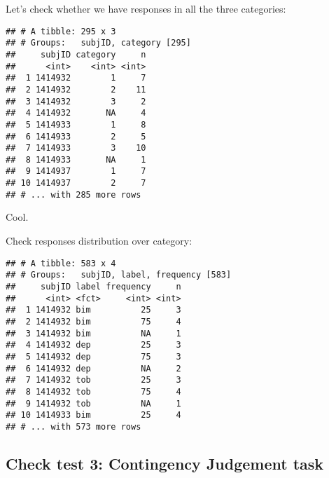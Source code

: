 \documentclass[
]{article}
\newenvironment{Shaded}{\begin{snugshade}}{\end{snugshade}}
\newcommand{\KeywordTok}[1]{\textcolor[rgb]{0.13,0.29,0.53}{\textbf{#1}}}
\newcommand{\NormalTok}[1]{#1}
\newcommand{\OperatorTok}[1]{\textcolor[rgb]{0.81,0.36,0.00}{\textbf{#1}}}
\newcommand{\StringTok}[1]{\textcolor[rgb]{0.31,0.60,0.02}{#1}}
\begin{document}
Let's check whether we have responses in all the three categories:

\begin{Shaded}
\end{Shaded}

\begin{verbatim}
## # A tibble: 295 x 3
## # Groups:   subjID, category [295]
##     subjID category     n
##      <int>    <int> <int>
##  1 1414932        1     7
##  2 1414932        2    11
##  3 1414932        3     2
##  4 1414932       NA     4
##  5 1414933        1     8
##  6 1414933        2     5
##  7 1414933        3    10
##  8 1414933       NA     1
##  9 1414937        1     7
## 10 1414937        2     7
## # ... with 285 more rows
\end{verbatim}

Cool.

Check responses distribution over category:

\begin{Shaded}
\end{Shaded}

\begin{verbatim}
## # A tibble: 583 x 4
## # Groups:   subjID, label, frequency [583]
##     subjID label frequency     n
##      <int> <fct>     <int> <int>
##  1 1414932 bim          25     3
##  2 1414932 bim          75     4
##  3 1414932 bim          NA     1
##  4 1414932 dep          25     3
##  5 1414932 dep          75     3
##  6 1414932 dep          NA     2
##  7 1414932 tob          25     3
##  8 1414932 tob          75     4
##  9 1414932 tob          NA     1
## 10 1414933 bim          25     4
## # ... with 573 more rows
\end{verbatim}

\hypertarget{check-test-3-contingency-judgement-task}{%
\subsection{Check test 3: Contingency Judgement
task}\label{check-test-3-contingency-judgement-task}}
\end{document}
